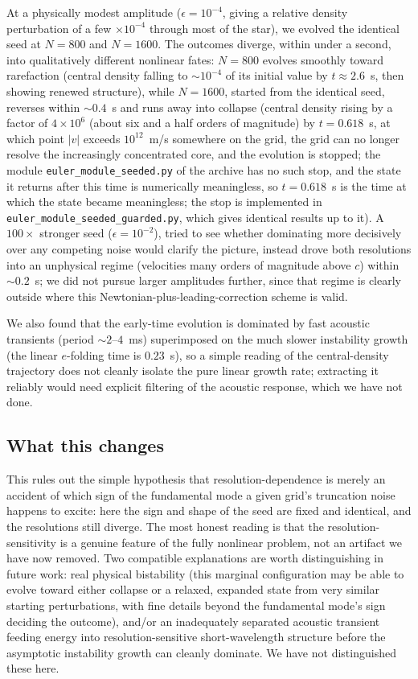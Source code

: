 \documentclass[11pt]{article}
\begin{document}
At a physically modest amplitude ($\epsilon=10^{-4}$, giving a relative density perturbation of a few $\times10^{-4}$ through most of the star), we evolved the identical seed at $N=800$ and $N=1600$. The outcomes diverge, within under a second, into qualitatively different nonlinear fates: $N=800$ evolves smoothly toward rarefaction (central density falling to $\sim\!10^{-4}$ of its initial value by $t\approx2.6$~s, then showing renewed structure), while $N=1600$, started from the identical seed, reverses within $\sim\!0.4$~s and runs away into collapse (central density rising by a factor of $4\times10^{6}$ (about six and a half orders of magnitude) by $t=0.618$~s, at which point $|v|$ exceeds $10^{12}$~m/s somewhere on the grid, the grid can no longer resolve the increasingly concentrated core, and the evolution is stopped; the module \texttt{euler\_module\_seeded.py} of the archive has no such stop, and the state it returns after this time is numerically meaningless, so $t=0.618$~s is the time at which the state became meaningless; the stop is implemented in \texttt{euler\_module\_seeded\_guarded.py}, which gives identical results up to it). A $100\times$ stronger seed ($\epsilon=10^{-2}$), tried to see whether dominating more decisively over any competing noise would clarify the picture, instead drove both resolutions into an unphysical regime (velocities many orders of magnitude above $c$) within $\sim\!0.2$~s; we did not pursue larger amplitudes further, since that regime is clearly outside where this Newtonian-plus-leading-correction scheme is valid.

We also found that the early-time evolution is dominated by fast acoustic transients (period $\sim\!2$--$4$~ms) superimposed on the much slower instability growth (the linear $e$-folding time is $0.23$~s), so a simple reading of the central-density trajectory does not cleanly isolate the pure linear growth rate; extracting it reliably would need explicit filtering of the acoustic response, which we have not done.

\subsection{What this changes}

This rules out the simple hypothesis that resolution-dependence is merely an accident of which sign of the fundamental mode a given grid's truncation noise happens to excite: here the sign and shape of the seed are fixed and identical, and the resolutions still diverge. The most honest reading is that the resolution-sensitivity is a genuine feature of the fully nonlinear problem, not an artifact we have now removed. Two compatible explanations are worth distinguishing in future work: real physical bistability (this marginal configuration may be able to evolve toward either collapse or a relaxed, expanded state from very similar starting perturbations, with fine details beyond the fundamental mode's sign deciding the outcome), and/or an inadequately separated acoustic transient feeding energy into resolution-sensitive short-wavelength structure before the asymptotic instability growth can cleanly dominate. We have not distinguished these here.
\end{document}
